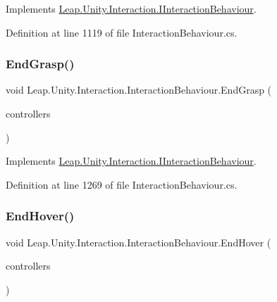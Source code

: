 Implements \mbox{\hyperlink{interface_leap_1_1_unity_1_1_interaction_1_1_i_interaction_behaviour_a5a85de0cc00d9c393b84c7fec456e506}{Leap.\+Unity.\+Interaction.\+I\+Interaction\+Behaviour}}.



Definition at line 1119 of file Interaction\+Behaviour.\+cs.

\mbox{\label{class_leap_1_1_unity_1_1_interaction_1_1_interaction_behaviour_a64b36a1d5314d1befc47447f8a3e46f9}} 
\subsubsection{\texorpdfstring{EndGrasp()}{EndGrasp()}}
{\footnotesize\ttfamily void Leap.\+Unity.\+Interaction.\+Interaction\+Behaviour.\+End\+Grasp (\begin{DoxyParamCaption}\item[{List$<$ \mbox{\hyperlink{class_leap_1_1_unity_1_1_interaction_1_1_interaction_controller}{Interaction\+Controller}} $>$}]{controllers }\end{DoxyParamCaption})}



Implements \mbox{\hyperlink{interface_leap_1_1_unity_1_1_interaction_1_1_i_interaction_behaviour_a337f8e0a31f507a3fcd2bdcf1abb9df1}{Leap.\+Unity.\+Interaction.\+I\+Interaction\+Behaviour}}.



Definition at line 1269 of file Interaction\+Behaviour.\+cs.

\mbox{\label{class_leap_1_1_unity_1_1_interaction_1_1_interaction_behaviour_a1011d32c8a3d054552d47ec44517d22e}} 
\subsubsection{\texorpdfstring{EndHover()}{EndHover()}}
{\footnotesize\ttfamily void Leap.\+Unity.\+Interaction.\+Interaction\+Behaviour.\+End\+Hover (\begin{DoxyParamCaption}\item[{List$<$ \mbox{\hyperlink{class_leap_1_1_unity_1_1_interaction_1_1_interaction_controller}{Interaction\+Controller}} $>$}]{controllers }\end{DoxyParamCaption})}



